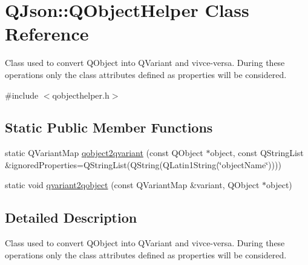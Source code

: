 \hypertarget{class_q_json_1_1_q_object_helper}{
\section{\-Q\-Json\-:\-:\-Q\-Object\-Helper \-Class \-Reference}
\label{class_q_json_1_1_q_object_helper}
}


\-Class used to convert \-Q\-Object into \-Q\-Variant and vivce-\/versa. \-During these operations only the class attributes defined as properties will be considered.  




{\ttfamily \#include $<$qobjecthelper.\-h$>$}

\subsection*{\-Static \-Public \-Member \-Functions}
\begin{DoxyCompactItemize}
\item 
static \-Q\-Variant\-Map \hyperlink{class_q_json_1_1_q_object_helper_a46dd6b44ea9e6bf0b3e4534e343e53a2}{qobject2qvariant} (const \-Q\-Object $\ast$object, const \-Q\-String\-List \&ignored\-Properties=\-Q\-String\-List(\-Q\-String(\-Q\-Latin1\-String(\char`\"{}object\-Name\char`\"{}))))
\item 
static void \hyperlink{class_q_json_1_1_q_object_helper_a74fbfcda64b4a1d65daaae14a09c3055}{qvariant2qobject} (const \-Q\-Variant\-Map \&variant, \-Q\-Object $\ast$object)
\end{DoxyCompactItemize}


\subsection{\-Detailed \-Description}
\-Class used to convert \-Q\-Object into \-Q\-Variant and vivce-\/versa. \-During these operations only the class attributes defined as properties will be considered. 

